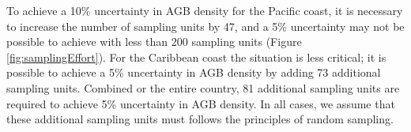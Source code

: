 \documentclass[review, authoryear]{elsarticle}   	%
\DeclareRobustCommand{\Carlos}{\todo[author=Carlos, inline, color=blue!40, size=\small]}
\begin{document}
To achieve a 10\% uncertainty in AGB density for the Pacific coast, it is necessary to increase the number of sampling units by 47, and a 5\% uncertainty may not be possible to achieve with less than 200 sampling units (Figure \ref{fig:samplingEffort}). For the Caribbean coast the situation is less critical; it is possible to achieve a 5\% uncertainty in AGB density by adding 73 additional sampling units. Combined or the entire country, 81 additional sampling units are required to achieve 5\% uncertainty in AGB density. In all cases, we assume that these additional sampling units must follows the principles of random sampling. 



\end{document}
